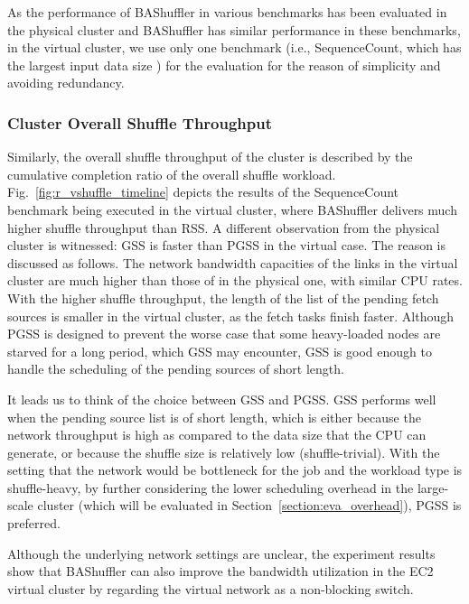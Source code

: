 \documentclass[10pt,journal,compsoc]{IEEEtran}
\begin{document}
As the performance of BAShuffler in various benchmarks has been
evaluated in the physical cluster
and BAShuffler has similar performance in these benchmarks, in the virtual cluster, 
we use only one benchmark (i.e., SequenceCount, which has the largest
input data size ) for the evaluation for the reason of simplicity and avoiding redundancy.

\subsubsection{Cluster Overall Shuffle Throughput}
Similarly, the overall shuffle throughput of the cluster is described by the cumulative completion ratio of the overall shuffle workload. 
Fig.~\ref{fig:r_vshuffle_timeline} depicts the results of the
SequenceCount benchmark being executed in the virtual cluster, 
where BAShuffler delivers much higher shuffle throughput than RSS. 
A different observation from the physical cluster is witnessed: GSS is faster than PGSS in the virtual case. 
The reason is discussed as follows. 
The network bandwidth capacities of the links in the virtual cluster are much higher than those of in the physical one, with similar CPU rates. 
With the higher shuffle throughput, the length of the list of the pending fetch sources is smaller in the virtual cluster, as the fetch tasks finish faster. 
Although PGSS is designed to prevent the worse
case that some heavy-loaded nodes are starved for a long period, which GSS may encounter, 
GSS is good enough to handle the scheduling of the pending sources of short length. 

It leads us to think of the choice between GSS and PGSS. 
GSS performs well when the pending source list is of short length, which is either because the network throughput is high as compared to the data size that the CPU can generate, or because the shuffle size is relatively low (shuffle-trivial). With the setting that the network would be bottleneck for the job and the workload type is shuffle-heavy, by further considering the lower scheduling overhead in the large-scale cluster (which will be evaluated in Section~\ref{section:eva_overhead}), PGSS is preferred. 


Although the underlying network settings are unclear, the experiment
results show that BAShuffler can also improve the bandwidth
utilization in the EC2 virtual cluster by regarding the virtual
network as a non-blocking switch.
\end{document}
